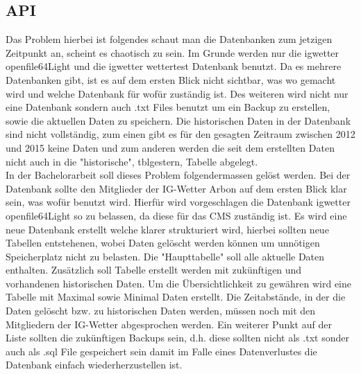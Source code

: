 \subsection{API}

Das Problem hierbei ist folgendes schaut man die Datenbanken zum jetzigen Zeitpunkt an, scheint es chaotisch zu sein. Im Grunde werden nur die igwetter openfile64Light und die igwetter wettertest Datenbank benutzt. Da es mehrere Datenbanken gibt,  ist es auf dem ersten Blick nicht sichtbar, was wo gemacht wird und welche Datenbank für wofür zuständig ist. Des weiteren wird nicht nur eine Datenbank sondern auch .txt Files benutzt um ein Backup zu erstellen, sowie die aktuellen Daten zu speichern. Die historischen Daten in der Datenbank sind nicht vollständig, zum einen gibt es für den gesagten Zeitraum zwischen 2012 und 2015 keine Daten und zum anderen werden die seit dem erstellten Daten nicht auch in die "historische", tblgestern, Tabelle abgelegt. \\


In der Bachelorarbeit soll dieses Problem folgendermassen gelöst werden. Bei der Datenbank sollte den Mitglieder der IG-Wetter Arbon auf dem ersten Blick klar sein, was wofür benutzt wird. Hierfür wird vorgeschlagen die Datenbank igwetter openfile64Light so zu belassen, da diese für das CMS zuständig ist. Es wird eine neue Datenbank erstellt welche klarer strukturiert wird, hierbei sollten neue Tabellen entstehenen, wobei Daten gelöscht werden können um unnötigen Speicherplatz nicht zu belasten. Die "Haupttabelle" soll alle aktuelle Daten enthalten. Zusätzlich soll Tabelle erstellt werden mit zukünftigen und vorhandenen historischen Daten. Um die Übersichtlichkeit zu gewähren wird eine Tabelle mit Maximal sowie Minimal Daten erstellt. Die Zeitabstände, in der die Daten gelöscht bzw. zu historischen Daten werden, müssen noch mit den Mitgliedern der IG-Wetter abgesprochen werden. Ein weiterer Punkt auf der Liste sollten die zukünftigen Backups sein, d.h. diese sollten nicht als .txt sonder auch als .sql File gespeichert sein damit im Falle eines Datenverlustes die Datenbank einfach wiederherzustellen ist.
